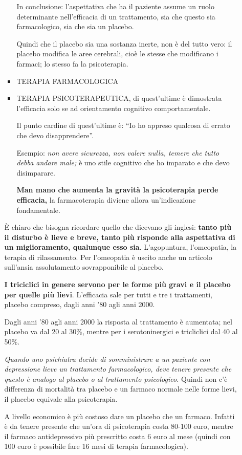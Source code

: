 \begin{itemize}
\begin{itemize}
\begin{itemize}
  In conclusione: l'aspettativa che ha il paziente assume un ruolo
  determinante nell'efficacia di un trattamento, sia che questo sia
  farmacologico, sia che sia un placebo.

  Quindi che il placebo sia una sostanza inerte, non è del tutto vero:
  il placebo modifica le aree cerebrali, cioè le stesse che modificano i
  farmaci; lo stesso fa la psicoterapia.

\item
  TERAPIA FARMACOLOGICA
  
\item
  TERAPIA PSICOTERAPEUTICA, di quest'ultime è dimostrata l'efficacia
  solo se ad orientamento cognitivo comportamentale.

  Il punto cardine di quest'ultime è: ``Io ho appreso qualcosa di errato
  che devo disapprendere''.

  Esempio: \emph{non avere sicurezza, non valere nulla, temere che tutto
  debba andare male;} è uno stile cognitivo che ho imparato e che devo
  disimparare.

  \textbf{Man mano che aumenta la gravità la psicoterapia perde
  efficacia,} la farmacoterapia diviene allora un'indicazione
  fondamentale.
\end{itemize}

È chiaro che bisogna ricordare quello che dicevano gli inglesi:
\textbf{tanto più il disturbo è lieve e breve, tanto più risponde alla
aspettativa di un miglioramento, qualunque esso sia}. L'agopuntura,
l'omeopatia, la terapia di rilassamento. Per l'omeopatia è uscito anche
un articolo sull'ansia assolutamento sovrapponibile al placebo.

\textbf{I triciclici in genere servono per le forme più gravi e il
placebo per quelle più lievi}. L'efficacia sale per tutti e tre i
trattamenti, placebo compreso, dagli anni '80 agli anni 2000.

Dagli anni '80 agli anni 2000 la risposta al trattamento è aumentata;
nel placebo va dal 20 al 30\%, mentre per i serotoninergici e
tricliclici dal 40 al 50\%.

\emph{\emph{Quando uno psichiatra decide di somministrare a un paziente
con depressione lieve un trattamento farmacologico, deve tenere presente
che questo è analogo al placebo o al trattamento psicologico.}} Quindi
non c'è differenza di mortalità tra placebo e un farmaco normale nelle
forme lievi, il placebo equivale alla psicoterapia.

A livello economico è più costoso dare un placebo che un farmaco.
Infatti è da tenere presente che un'ora di psicoterapia costa 80-100
euro, mentre il farmaco antidepressivo più prescritto costa 6 euro al
mese (quindi con 100 euro è possibile fare 16 mesi di terapia
farmacologica).


\end{itemize}
\end{itemize}
